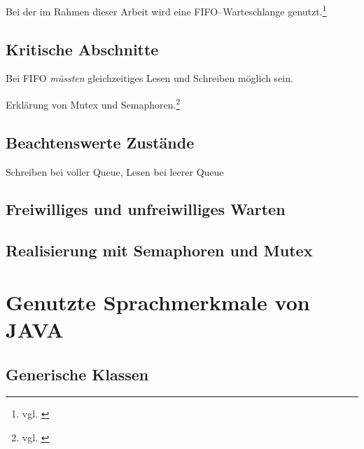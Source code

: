 Bei der im Rahmen dieser Arbeit wird eine FIFO–Warteschlange genutzt.\footnote{vgl. \cite{javadoc:lbq}}


\subsection{Kritische Abschnitte} %
\label{sub:kritische_abschnitte}

Bei \ac{FIFO} \textit{müssten} gleichzeitiges Lesen und Schreiben möglich sein.

Erklärung von Mutex und Semaphoren.\footnote{vgl. \cite{oscon}}


\subsection{Beachtenswerte Zustände} %
\label{sub:beachtenswerte_zustande}

Schreiben bei voller Queue, Lesen bei leerer Queue


\subsection{Freiwilliges und unfreiwilliges Warten} %
\label{sub:freiwilliges_und_unfreiwilliges_warten}


\subsection{Realisierung mit Semaphoren und Mutex} %
\label{sub:realisierung_mit_semaphoren_und_mutex}



\newpage
\section{Genutzte Sprachmerkmale von JAVA} %
\label{sec:genutzte_sprachmerkmale_von_java}

\subsection{Generische Klassen} %
\label{sub:generics}

